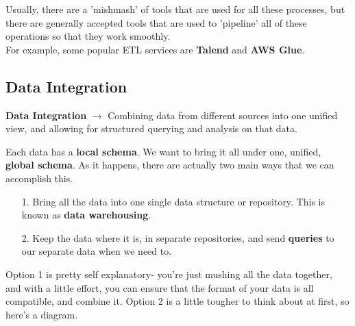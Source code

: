 \documentclass[english, 10pt]{article}
\begin{document}
Usually, there are a 'mishmash' of tools that are used for all these processes, but there are generally accepted tools that are used to 'pipeline' all of these operations so that they work smoothly.\\

For example, some popular ETL services are \textbf{Talend} and \textbf{AWS Glue}.\\

\subsection{Data Integration}

\begin{tcolorbox}[title=Definition:,colframe=red!75!black,colback=red!5!white,arc=0pt,fonttitle=\bfseries]
\textbf{Data Integration} $\rightarrow$ Combining data from different sources into one unified view, and allowing for structured querying and analysis on that data.
\end{tcolorbox}

\hfill \break Each data has a \textbf{local schema}. We want to bring it all under one, unified, \textbf{global schema}. As it happens, there are actually two main ways that we can accomplish this.

\begin{itemize}
	\item[1.] Bring all the data into one single data structure or repository. This is known as \textbf{data warehousing}.
	\item[2.] Keep the data where it is, in separate repositories, and send \textbf{queries} to our separate data when we need to.
\end{itemize}

Option 1 is pretty self explanatory- you're just mushing all the data together, and with a little effort, you can ensure that the format of your data is all compatible, and combine it. Option 2 is a little tougher to think about at first, so here's a diagram.\\
\end{document}
